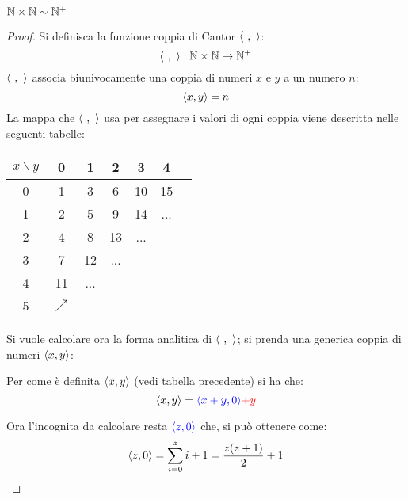 \begin{theorem}
    $\mathbb{N}\times\mathbb{N}\sim\mathbb{N}^+$
\end{theorem}
\begin{proof}
    Si definisca la funzione coppia di Cantor $\langle\ ,\ \rangle$:
    $$ \langle\ ,\ \rangle:\mathbb{N}\times\mathbb{N}\rightarrow\mathbb{N}^+ $$
    $\langle\ ,\ \rangle$ associa biunivocamente una coppia di numeri $x$ e 
    $y$ a un numero $n$:
    $$ \langle x,y\rangle = n $$
    La mappa che $\langle\ ,\ \rangle$ usa per assegnare i valori di ogni coppia viene 
    descritta nelle seguenti tabelle:

    \begin{minipage}{.48\textwidth}
        \centering
        \begin{tabular}{c|c c c c c c}
            $x\backslash y$&0 &1 &2 &3 &4\\ \hline
               0 &1 &3 &6 &10&15\\
               1 &2 &5 &9 &14&...\\
               2 &4 &8 &13&...&  \\
               3 &7 &12&...&  &  \\
               4 &11&...&  &  &  \\
               5 &$\nearrow$&&&&\\
        \end{tabular}
    \end{minipage}
    \begin{minipage}{.48\textwidth}
        \centering
        
    \end{minipage}

    Si vuole calcolare ora la forma analitica di $\langle\ ,\ \rangle$; si prenda una generica
    coppia di numeri $\langle x,y\rangle$:

    \begin{minipage}{.4\textwidth}
        \centering
        
    \end{minipage}
    \begin{minipage}{.58\textwidth}
        Per come è definita $\langle x,y\rangle$ (vedi tabella precedente) si ha che:
        \begin{equation}\label{eq:cantor_analytic}
            \langle x,y\rangle = {\color{blue}\langle x+y,0\rangle}{\color{red}+y}
        \end{equation}

        Ora l'incognita da calcolare resta $\color{blue}\langle z,0\rangle$ che,
        si può ottenere come:
        \begin{equation}\label{eq:cantor_analytic_2}
            \langle z,0\rangle = \sum_{i=0}^z i+1 = \frac{z(z+1)}{2}+1
        \end{equation}
    \end{minipage}
    

\end{proof}
